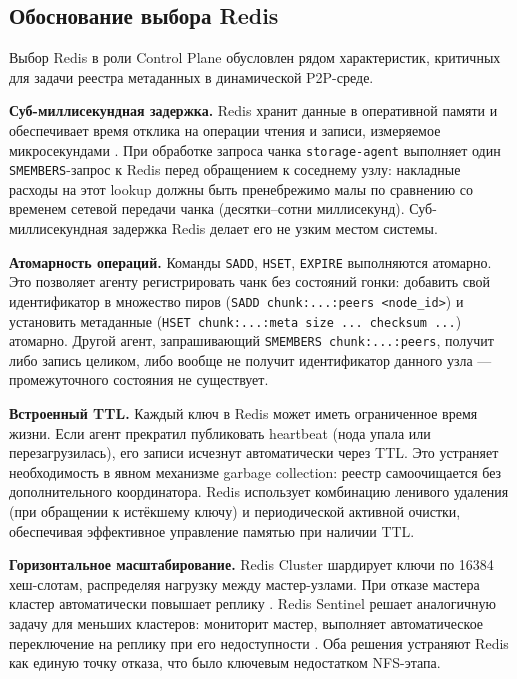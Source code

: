 \subsection*{Обоснование выбора Redis}

Выбор Redis в роли Control Plane обусловлен рядом характеристик, критичных для задачи реестра метаданных в динамической P2P-среде.

\textbf{Суб-миллисекундная задержка.} Redis хранит данные в оперативной памяти и обеспечивает время отклика на операции чтения и записи, измеряемое микросекундами \cite{redis_cluster_docs}. При обработке запроса чанка \texttt{storage-agent} выполняет один \texttt{SMEMBERS}-запрос к Redis перед обращением к соседнему узлу: накладные расходы на этот lookup должны быть пренебрежимо малы по сравнению со временем сетевой передачи чанка (десятки--сотни миллисекунд). Суб-миллисекундная задержка Redis делает его не узким местом системы.

\textbf{Атомарность операций.} Команды \texttt{SADD}, \texttt{HSET}, \texttt{EXPIRE} выполняются атомарно. Это позволяет агенту регистрировать чанк без состояний гонки: добавить свой идентификатор в множество пиров (\texttt{SADD chunk:...:peers <node\_id>}) и установить метаданные (\texttt{HSET chunk:...:meta size ... checksum ...}) атомарно. Другой агент, запрашивающий \texttt{SMEMBERS chunk:...:peers}, получит либо запись целиком, либо вообще не получит идентификатор данного узла --- промежуточного состояния не существует.

\textbf{Встроенный TTL.} Каждый ключ в Redis может иметь ограниченное время жизни. Если агент прекратил публиковать heartbeat (нода упала или перезагрузилась), его записи исчезнут автоматически через TTL. Это устраняет необходимость в явном механизме garbage collection: реестр самоочищается без дополнительного координатора. Redis использует комбинацию ленивого удаления (при обращении к истёкшему ключу) и периодической активной очистки, обеспечивая эффективное управление памятью при наличии TTL.

\textbf{Горизонтальное масштабирование.} Redis Cluster шардирует ключи по 16384 хеш-слотам, распределяя нагрузку между мастер-узлами. При отказе мастера кластер автоматически повышает реплику \cite{redis_cluster_docs}. Redis Sentinel решает аналогичную задачу для меньших кластеров: мониторит мастер, выполняет автоматическое переключение на реплику при его недоступности \cite{redis_sentinel_docs}. Оба решения устраняют Redis как единую точку отказа, что было ключевым недостатком NFS-этапа.

